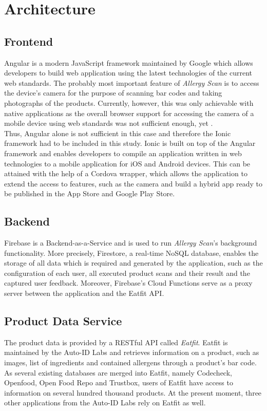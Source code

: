 \section{Architecture}

\subsection{Frontend}
Angular is a modern JavaScript framework maintained by Google \citep{angular} which allows developers to build web application using the latest technologies of the current web standards. The probably most important feature of \emph{Allergy Scan} is to access the device's camera for the purpose of scanning bar codes and taking photographs of the products. Currently, however, this was only achievable with native applications \citep[28]{jobe_2013} as the overall browser support for accessing the camera of a mobile device using web standards was not sufficient enough, yet \citep{takePhoto}.\\

Thus, Angular alone is not sufficient in this case and therefore the Ionic framework \citep{ionic} had to be included in this study. Ionic is built on top of the Angular framework and enables developers to compile an application written in web technologies to a mobile application for iOS and Android devices. This can be attained with the help of a Cordova \citep{cordova} wrapper, which allows the application to extend the access to features, such as the camera and build a hybrid app \citep[29]{jobe_2013} ready to be published in the App Store and Google Play Store.

\subsection{Backend}
Firebase is a Backend-as-a-Service and is used to run \emph{Allergy Scan}'s background functionality. More precisely, Firestore, a real-time NoSQL database, enables the storage of all data which is required and generated by the application, such as the configuration of each user, all executed product scans and their result and the captured user feedback. Moreover, Firebase's Cloud Functions serve as a proxy server between the application and the Eatfit API.

\subsection{Product Data Service}
\label{sub:eatfit}

The product data is provided by a RESTful API called \emph{Eatfit}. Eatfit is maintained by the Auto-ID Labs and retrieves information on a product, such as images, list of ingredients and contained allergens through a product’s bar code. As several existing databases are merged into Eatfit, namely Codecheck, Openfood, Open Food Repo and Trustbox, users of Eatfit have access to information on several hundred thousand products. At the present moment, three other applications from the Auto-ID Labs rely on Eatfit as well.